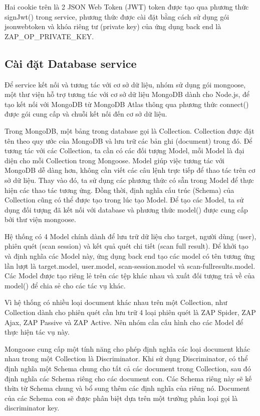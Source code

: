Hai cookie trên là 2 JSON Web Token (JWT) token được tạo qua phương thức signJwt() trong service, phương thức được cài đặt bằng cách sử dụng gói jsonwebtoken và khóa riêng tư (private key) của ứng dụng back end là ZAP\_OP\_PRIVATE\_KEY.

\subsection{Cài đặt Database service}

\tab Để service kết nối và tương tác với cơ sở dữ liệu, nhóm sử dụng gói mongoose, một thư viện hỗ trợ tương tác với cơ sở dữ liệu MongoDB dành cho Node.js, để tạo kết nối với MongoDB từ MongoDB Atlas thông qua phương thức connect() được gói cung cấp và chuỗi kết nối đến cơ sở dữ liệu.
\par

Trong MongoDB, một bảng trong database gọi là Collection. Collection được đặt tên theo quy ước của MongoDB và lưu trữ các bản ghi (document) trong đó. Để tương tác với các Collection, ta cần có các đối tượng Model, mỗi Model là đại diện cho mỗi Collection trong Mongoose. Model giúp việc tương tác với MongoDB dễ dàng hơn, không cần viết các câu lệnh trực tiếp để thao tác trên cơ sở dữ liệu. Thay vào đó, ta sử dụng các phương thức có sẵn trong Model để thực hiện các thao tác tương ứng. Đồng thời, định nghĩa cấu trúc (Schema) của Collection cũng có thể được tạo trong lúc tạo Model. Để tạo các Model, ta sử dụng đối tượng đã kết nối với database và phương thức model() được cung cấp bởi thư viện mongoose.
\par

Hệ thống có 4 Model chính dành để lưu trữ dữ liệu cho target, người dùng (user), phiên quét (scan session) và kết quả quét chi tiết (scan full result). Để khởi tạo và định nghĩa các Model này, ứng dụng back end tạo các model có tên tương ứng lần lượt là target.model, user.model, scan-session.model và scan-fullresults.model. Các Model được tạo riêng lẻ trên các tệp khác nhau và xuất đối tượng trả về của model() để chia sẻ cho các tác vụ khác.

Vì hệ thống có nhiều loại document khác nhau trên một Collection, như Collection dành cho phiên quét cần lưu trữ 4 loại phiên quét là ZAP Spider, ZAP Ajax, ZAP Passive và ZAP Active. Nên nhóm cần cấu hình cho các Model để thực hiện tác vụ này.
\par

Mongoose cung cấp một tính năng cho phép định nghĩa các loại document khác nhau trong một Collection là Discriminator. Khi sử dụng Discriminator, có thể định nghĩa một Schema chung cho tất cả các document trong Collection, sau đó định nghĩa các Schema riêng cho các document con. Các Schema riêng này sẽ kế thừa từ Schema chung và bổ sung thêm các định nghĩa của riêng nó. Document của các Schema con sẽ được phân biệt dựa trên một trường phân loại gọi là discriminator key.
\par


